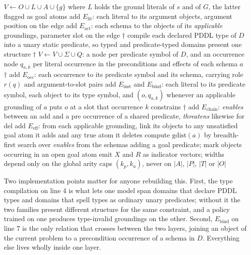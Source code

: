\documentclass{article} %
\newcommand{\gadar}{GADAR}                 %
\begin{document}
\begin{algorithm}[t]
\caption{Construction of the \gadar{} graph for $(s, G, D)$}
\label{alg:graph}
\begin{algorithmic}[1]
\STATE $V \leftarrow O \cup L \cup A \cup \{g\}$ where $L$ holds the ground
  literals of $s$ and of $G$, the latter flagged as goal atoms
\STATE add $E_{\mathrm{lit}}$: each literal to its argument objects, argument
  position on the edge
\STATE add $E_{\mathrm{act}}$: each schema to the objects of its
  \emph{applicable} groundings, parameter slot on the edge
\STATE $\dagger$ compile each declared PDDL type of $D$ into a unary static
  predicate, so typed and predicate-typed domains present one structure
\STATE $\dagger$ $V \leftarrow V \cup \Sigma \cup Q$: a node per predicate
  symbol of $D$, and an occurrence node $q_{a,k}$ per literal occurrence in
  the preconditions and effects of each schema $a$
\STATE $\dagger$ add $E_{\mathrm{occ}}$: each occurrence to its predicate
  symbol and its schema, carrying role $r(q)$ and argument-to-slot pairs
\STATE add $E_{\mathrm{inst}}$ and $E_{\mathrm{bind}}$: each literal to its
  predicate symbol, each object to its type symbol, and $(o, q_{a,k})$
  whenever an applicable grounding of $a$ puts $o$ at a slot that occurrence
  $k$ constrains
\STATE $\dagger$ add $E_{\mathrm{chain}}$: \textit{enables} between an add and
  a pre occurrence of a shared predicate, \textit{threatens} likewise for del
\STATE add $E_{\mathrm{eff}}$: from each applicable grounding, link its
  objects to any unsatisfied goal atom it adds and any true atom it deletes
\STATE compute $\mathrm{gdist}(a)$ by breadth-first search over
  \textit{enables} from the schemas adding a goal predicate; mark objects
  occurring in an open goal atom
\STATE emit $X$ and $R$ as indicator vectors; widths depend only on the global
  arity caps $(k_p, k_a)$, never on $|A|$, $|P|$, $|T|$ or $|O|$
\end{algorithmic}
\end{algorithm}

Two implementation points matter for anyone rebuilding this. First, the type
compilation on line 4 is what lets one model span domains that declare PDDL
types and domains that spell types as ordinary unary predicates; without it
the two families present different structure for the same constraint, and a
policy trained on one produces type-invalid groundings on the other. Second,
$E_{\mathrm{bind}}$ on line 7 is the only relation that crosses between the
two layers, joining an object of the current problem to a precondition
occurrence of a schema in $D$. Everything else lives wholly inside one layer.
\end{document}
